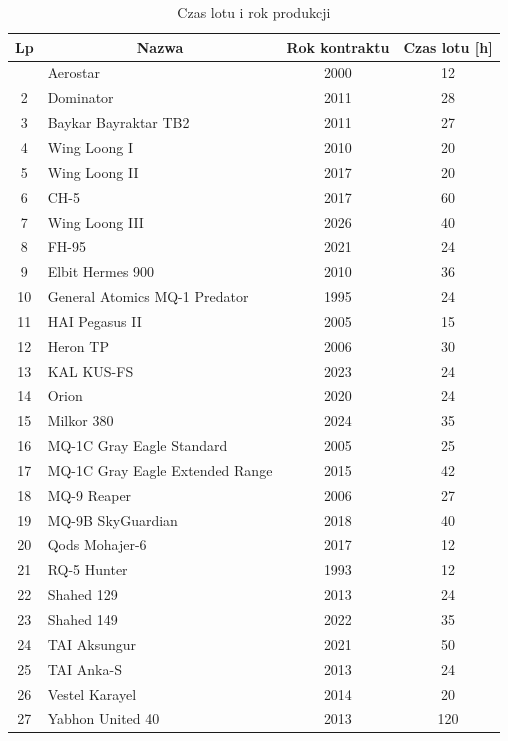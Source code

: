 \documentclass[
    bindingoffset=5mm,
    footnoteindent=3mm,
    hyphenation=true    
]{src/wut-thesis}
\begin{document}

\captionsetup[figure]{list=no}
\captionsetup[table]{list=no}

\clearpage
{}
\begin{longtable}{| c | m{0,5\linewidth} | c | c |}
    \caption{Czas lotu i rok produkcji}
    \label{table:timeyear} \\
    \hline
    \textbf{Lp} & \multicolumn{1}{c|}{\textbf{Nazwa}} & \textbf{Rok kontraktu} & \textbf{Czas lotu [h]} \\ \hline \hline
    \endfirsthead


    \hline
    \endfoot
    1 & Aerostar & 2000 & 12 \\ \hline
    2 & Dominator & 2011 & 28 \\ \hline
    3 & Baykar Bayraktar TB2 & 2011 & 27 \\ \hline
    4 & Wing Loong I & 2010 & 20 \\ \hline
    5 & Wing Loong II & 2017 & 20 \\ \hline
    6 & CH-5 & 2017 & 60 \\ \hline
    7 & Wing Loong III & 2026 & 40 \\ \hline
    8 & FH-95 & 2021 & 24 \\ \hline
    9 & Elbit Hermes 900 & 2010 & 36 \\ \hline
    10 & General Atomics MQ-1 Predator & 1995 & 24 \\ \hline
    11 & HAI Pegasus II & 2005 & 15 \\ \hline
    12 & Heron TP & 2006 & 30 \\ \hline
    13 & KAL KUS-FS & 2023 & 24 \\ \hline
    14 & Orion & 2020 & 24 \\ \hline
    15 & Milkor 380 & 2024 & 35 \\ \hline
    16 & MQ-1C Gray Eagle Standard & 2005 & 25 \\ \hline
    17 & MQ-1C Gray Eagle Extended Range & 2015 & 42 \\ \hline
    18 & MQ-9 Reaper & 2006 & 27 \\ \hline
    19 & MQ-9B SkyGuardian & 2018 & 40 \\ \hline
    20 & Qods Mohajer-6 & 2017 & 12 \\ \hline
    21 & RQ-5 Hunter & 1993 & 12 \\ \hline
    22 & Shahed 129 & 2013 & 24 \\ \hline
    23 & Shahed 149 & 2022 & 35 \\ \hline
    24 & TAI Aksungur & 2021 & 50 \\ \hline
    25 & TAI Anka-S & 2013 & 24 \\ \hline
    26 & Vestel Karayel & 2014 & 20 \\ \hline
    27 & Yabhon United 40 & 2013 & 120 \\ \hline
\end{longtable}
\end{document}
